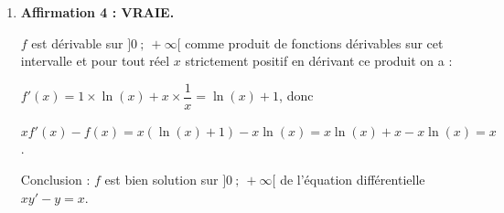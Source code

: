 \documentclass[10pt]{article}
\providecommand{\np}[2][]{{#2~#1}}
\begin{document}
\begin{enumerate}
Déterminons le nombre de code ne contenant pas de 0 :

Il y a $9\times 9 \times 9 \times 9 \times 3 \times 2 = \np{39366}$ codes ne contenant pas de 0. (9 valeurs possibles pour chacun des chiffres et 3 valeurs possibles pour la première lettre et deux valeurs possible pour la deuxième car elles doivent être distinctes.)

Il y a donc $\np{60000} -\np{39366}=\np{20634}$ codes contenant au moins un zéro.

	\item \textbf{Affirmation 4 : VRAIE.}


$f$ est dérivable sur $]0~;~+\infty[$ comme produit de fonctions dérivables sur cet intervalle et pour tout réel $x$ strictement positif en dérivant ce produit  on a : 

$f'(x) = 1 \times \ln(x) + x\times \dfrac{1}{x}= \ln(x) + 1$, donc

$xf'(x) - f(x)= x \left(\ln(x) + 1\right) - x\ln(x) = x\ln(x) + x - x\ln(x) = x$.

Conclusion : $f$ est bien solution sur $]0~;~+\infty[$ de l'équation différentielle $xy' - y = x$.
\end{enumerate}

\bigskip
\end{document}
